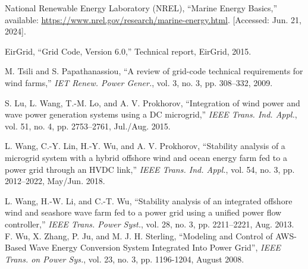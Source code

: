 \documentclass[conference]{IEEEtran}
\begin{document}
\begin{thebibliography}{6}

National Renewable Energy Laboratory (NREL), “Marine Energy Basics,” available: \url{https://www.nrel.gov/research/marine-energy.html}. [Accessed: Jun. 21, 2024].

EirGrid, “Grid Code, Version 6.0,” Technical report, EirGrid, 2015.

M. Tsili and S. Papathanassiou, “A review of grid-code technical requirements for wind farms,” \textit{IET Renew. Power Gener.}, vol. 3, no. 3, pp. 308–332, 2009.

S. Lu, L. Wang, T.-M. Lo, and A. V. Prokhorov, “Integration of wind power and wave power generation systems using a DC microgrid,” \textit{IEEE Trans. Ind. Appl.}, vol. 51, no. 4, pp. 2753–2761, Jul./Aug. 2015.

L. Wang, C.-Y. Lin, H.-Y. Wu, and A. V. Prokhorov, “Stability analysis of a microgrid system with a hybrid offshore wind and ocean energy farm fed to a power grid through an HVDC link,” \textit{IEEE Trans. Ind. Appl.}, vol. 54, no. 3, pp. 2012–2022, May/Jun. 2018.

L. Wang, H.-W. Li, and C.-T. Wu, “Stability analysis of an integrated offshore wind and seashore wave farm fed to a power grid using a unified power flow controller,” \textit{IEEE Trans. Power Syst.}, vol. 28, no. 3, pp. 2211–2221, Aug. 2013.
F. Wu, X. Zhang, P. Ju, and M. J. H. Sterling, ``Modeling and Control of AWS-Based Wave Energy Conversion System Integrated Into Power Grid'', \textit{IEEE Trans. on Power Sys.}, vol. 23, no. 3, pp. 1196-1204, August 2008.

\end{thebibliography}
\end{document}
